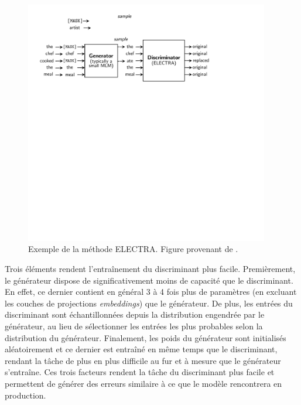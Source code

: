 \documentclass[12pt,twoside,maitrise]{dms}
\theoremstyle{definition}
\numberwithin{equation}{section}
\numberwithin{table}{chapter}
\numberwithin{figure}{chapter}
\begin{document}
\begin{figure}
    \begin{center}
        \includegraphics[width=0.95\textwidth]{figures/electra_entr.pdf}
    \end{center}
    \caption{Exemple de la méthode ELECTRA. Figure provenant de \cite{clark2020electrapretrainingtextencoders}.}
    \label{fig:electra}
\end{figure}

Trois éléments rendent l'entraînement du discriminant plus facile.
Premièrement, le générateur dispose de significativement moins de capacité que
le discriminant. En effet, ce dernier contient en général 3 à 4 fois plus de
paramètres (en excluant les couches de projections \textit{embeddings}) que le
générateur. De plus, les entrées du discriminant sont échantillonnées depuis la
distribution engendrée par le générateur, au lieu de sélectionner les entrées
les plus probables selon la distribution du générateur. Finalement, les poids
du générateur sont initialisés aléatoirement et ce dernier est entraîné en même
temps que le discriminant, rendant la tâche de plus en plus difficile au fur et
à mesure que le générateur s'entraîne. Ces trois facteurs rendent la tâche du
discriminant plus facile et permettent de générer des erreurs similaire à ce
que le modèle rencontrera en production.\\
\end{document}
